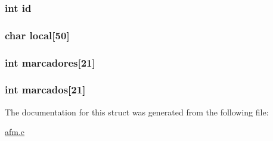 \hypertarget{structresultado_a7441ef0865bcb3db9b8064dd7375c1ea}{
\subsubsection[{id}]{\setlength{\rightskip}{0pt plus 5cm}int {\bf id}}}\label{structresultado_a7441ef0865bcb3db9b8064dd7375c1ea}
\hypertarget{structresultado_ad0fbc2e59205ea604d8a9bac33ed9473}{
\subsubsection[{local}]{\setlength{\rightskip}{0pt plus 5cm}char {\bf local}\mbox{[}50\mbox{]}}}\label{structresultado_ad0fbc2e59205ea604d8a9bac33ed9473}
\hypertarget{structresultado_aa291c72d9a8809f53432613048a6fdfb}{
\subsubsection[{marcadores}]{\setlength{\rightskip}{0pt plus 5cm}int {\bf marcadores}\mbox{[}21\mbox{]}}}\label{structresultado_aa291c72d9a8809f53432613048a6fdfb}
\hypertarget{structresultado_a4e7b44437e808dd2fd5e173d52e71002}{
\subsubsection[{marcados}]{\setlength{\rightskip}{0pt plus 5cm}int {\bf marcados}\mbox{[}21\mbox{]}}}\label{structresultado_a4e7b44437e808dd2fd5e173d52e71002}


\-The documentation for this struct was generated from the following file\-:\begin{DoxyCompactItemize}
\item 
\hyperlink{afm_8c}{afm.\-c}\end{DoxyCompactItemize}
